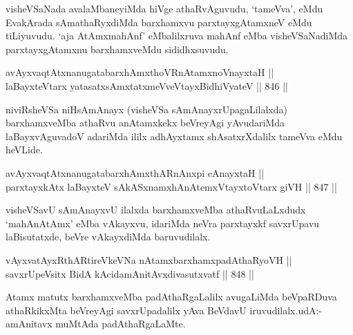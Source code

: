 \begin{artha}
visheVSaNada avalaMbaneyiMda hiVge athaRvAguvudu, `tameVva', eMdu EvakArada sAmathaRyxdiMda barxhamxvu parxtayxgAtamxneV eMdu tiLiyuvudu. `aja AtAmxmahAnf' eMbalilxruva mahAnf eMba visheVSaNadiMda parxtayxgAtamxnu barxhamxveMdu sididhxsuvudu.
\end{artha}


\begin{shl}
avAyxvaqtAtxnanugatabarxhAmxthoVR\s nAtamxnoV\s nayxtaH || \\
laBayxteV\s tarx yatasatxsAmxtatxmeVveVtayxBidhiVyateV \hfill || 846 ||  
\end{shl}

\begin{artha}
niviRsheVSa niHsAmAnayx (visheVSa sAmAnayxrUpagaLilalxda) barxhamxveMba athaRvu anAtamxkekx beVreyAgi yAvudariMda laBayxvAguvadoV adariMda ililx adhAyxtamx shAsatxrXdalilx tameVva eMdu heVLide.
\end{artha}


\begin{shl}
avAyxvaqtAtxnanugatabarxhAmxthARnAnxpi cAnayxtaH || \\
parxtayxkAtx laBayxteV sAkASxnamxhAnAtemxVtayxtoV\s tarx giVH \hfill || 847 ||  
\end{shl}

\begin{artha}
visheVSavU sAmAnayxvU ilalxda barxhamxveMba athaRvuLaLxdudx `mahAnAtAmx' eMba vAkayxvu, idariMda neVra parxtayxkf savxrUpavu laBisutatxde, beVre vAkayxdiMda baruvudilalx.
\end{artha}


\begin{shl}
vAyxvatAyxRthARtireVkeVNa nA\s \s tamxbarxhamxpadAthaRyoVH || \\
savxrUpeV\s sitx BidA kAcidamAnitAvxdivasutxvatf \hfill || 848 ||  
\end{shl}

\begin{artha}
Atamx matutx barxhamxveMba padAthaRgaLalilx avugaLiMda beVpaRDuva athaRkikxMta beVreyAgi savxrUpadalilx yAva BeVdavU iruvudilalx.udA:-amAnitavx muMtAda padAthaRgaLaMte.
\end{artha}

